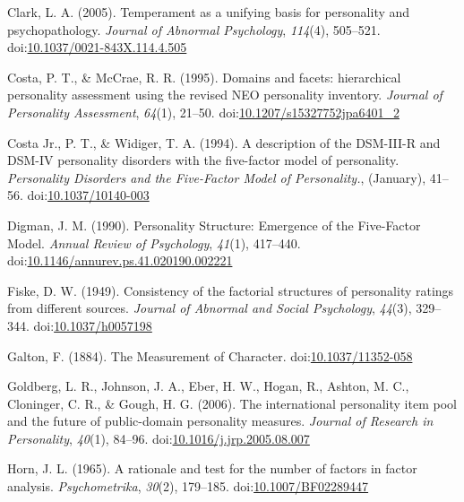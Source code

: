 \documentclass[,man,floatsintext]{apa6}
\theoremstyle{definition}
\theoremstyle{definition}
\theoremstyle{definition}
\theoremstyle{remark}
\begin{document}
\leavevmode\hypertarget{ref-Clark2005}{}%
Clark, L. A. (2005). Temperament as a unifying basis for personality and
psychopathology. \emph{Journal of Abnormal Psychology}, \emph{114}(4),
505--521.
doi:\href{https://doi.org/10.1037/0021-843X.114.4.505}{10.1037/0021-843X.114.4.505}

\leavevmode\hypertarget{ref-Costa1995}{}%
Costa, P. T., \& McCrae, R. R. (1995). Domains and facets: hierarchical
personality assessment using the revised NEO personality inventory.
\emph{Journal of Personality Assessment}, \emph{64}(1), 21--50.
doi:\href{https://doi.org/10.1207/s15327752jpa6401_2}{10.1207/s15327752jpa6401\_2}

\leavevmode\hypertarget{ref-Widiger1994}{}%
Costa Jr., P. T., \& Widiger, T. A. (1994). A description of the
DSM-III-R and DSM-IV personality disorders with the five-factor model of
personality. \emph{Personality Disorders and the Five-Factor Model of
Personality.}, (January), 41--56.
doi:\href{https://doi.org/10.1037/10140-003}{10.1037/10140-003}

\leavevmode\hypertarget{ref-Digman1990}{}%
Digman, J. M. (1990). Personality Structure: Emergence of the
Five-Factor Model. \emph{Annual Review of Psychology}, \emph{41}(1),
417--440.
doi:\href{https://doi.org/10.1146/annurev.ps.41.020190.002221}{10.1146/annurev.ps.41.020190.002221}

\leavevmode\hypertarget{ref-Fiske1949}{}%
Fiske, D. W. (1949). Consistency of the factorial structures of
personality ratings from different sources. \emph{Journal of Abnormal
and Social Psychology}, \emph{44}(3), 329--344.
doi:\href{https://doi.org/10.1037/h0057198}{10.1037/h0057198}

\leavevmode\hypertarget{ref-Galton1884}{}%
Galton, F. (1884). The Measurement of Character.
doi:\href{https://doi.org/10.1037/11352-058}{10.1037/11352-058}

\leavevmode\hypertarget{ref-Goldberg2006}{}%
Goldberg, L. R., Johnson, J. A., Eber, H. W., Hogan, R., Ashton, M. C.,
Cloninger, C. R., \& Gough, H. G. (2006). The international personality
item pool and the future of public-domain personality measures.
\emph{Journal of Research in Personality}, \emph{40}(1), 84--96.
doi:\href{https://doi.org/10.1016/j.jrp.2005.08.007}{10.1016/j.jrp.2005.08.007}

\leavevmode\hypertarget{ref-Horn1965}{}%
Horn, J. L. (1965). A rationale and test for the number of factors in
factor analysis. \emph{Psychometrika}, \emph{30}(2), 179--185.
doi:\href{https://doi.org/10.1007/BF02289447}{10.1007/BF02289447}
\end{document}
